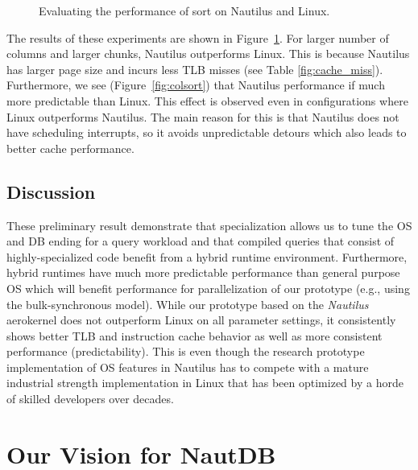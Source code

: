 \documentclass[conference]{IEEEtran}
\begin{document}
\begin{figure}[t]
\begin{minipage}{0.32\linewidth}
    \label{fig:cache_miss}
  \end{minipage}

\caption{Evaluating the performance of sort on Nautilus and Linux.}
  \label{fig:perf-eval}
\end{figure}

The results of these experiments are shown in Figure~\ref{fig:perf-eval}.   For larger number of columns and larger chunks, Nautilus outperforms Linux. This is because Nautilus has larger page size and incurs less TLB misses (see Table \ref{fig:cache_miss}).   Furthermore, we see (Figure~\ref{fig:colsort}) that Nautilus performance if much more predictable than Linux. This effect is observed even in configurations where Linux outperforms Nautilus. The main reason for this is that Nautilus does not have scheduling interrupts, so it avoids unpredictable detours which also leads to better cache performance.



\subsection{Discussion}
\label{sec:discussion}


These preliminary result demonstrate that specialization allows us to tune the OS and DB ending for a query workload and that compiled queries that consist of highly-specialized code benefit from a hybrid runtime environment.
Furthermore, hybrid runtimes have much more predictable performance than general purpose OS which will benefit performance for parallelization of our prototype (e.g., using the bulk-synchronous model).
While our prototype based on the \emph{Nautilus} aerokernel does not outperform Linux on all parameter settings, it consistently shows better TLB and instruction cache behavior as well as more consistent performance (predictability). This is even though the  research prototype implementation of OS features in Nautilus has to compete with a mature industrial strength implementation in Linux that has been optimized by a horde of skilled developers over decades. 

\section{Our Vision for NautDB}
\label{sec:our-vision-nautdb}
\end{document}
